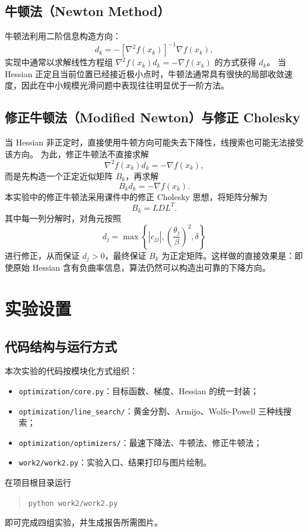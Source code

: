 \documentclass[12pt,a4paper]{ctexart}
\begin{document}
\subsection{牛顿法（Newton Method）}
牛顿法利用二阶信息构造方向：
\begin{equation}
d_k = -[\nabla^2 f(x_k)]^{-1}\nabla f(x_k),
\end{equation}
实现中通常以求解线性方程组 $\nabla^2 f(x_k) d_k = -\nabla f(x_k)$ 的方式获得 $d_k$。
当 Hessian 正定且当前位置已经接近极小点时，牛顿法通常具有很快的局部收敛速度，因此在中小规模光滑问题中表现往往明显优于一阶方法。

\subsection{修正牛顿法（Modified Newton）与修正 Cholesky}
当 Hessian 非正定时，直接使用牛顿方向可能失去下降性，线搜索也可能无法接受该方向。
为此，修正牛顿法不直接求解
\[
\nabla^2 f(x_k) d_k = -\nabla f(x_k),
\]
而是先构造一个正定近似矩阵 $B_k$，再求解
\begin{equation}
B_k d_k = -\nabla f(x_k).
\end{equation}
本实验中的修正牛顿法采用课件中的修正 Cholesky 思想，将矩阵分解为
\[
B_k = L D L^T.
\]
其中每一列分解时，对角元按照
\[
d_j = \max\left\{|c_{jj}|,\left(\frac{\theta_j}{\beta}\right)^2,\delta\right\}
\]
进行修正，从而保证 $d_j>0$，最终保证 $B_k$ 为正定矩阵。这样做的直接效果是：即使原始 Hessian 含有负曲率信息，算法仍然可以构造出可靠的下降方向。

\section{实验设置}
\subsection{代码结构与运行方式}
本次实验的代码按模块化方式组织：
\begin{itemize}
  \item \texttt{optimization/core.py}：目标函数、梯度、Hessian 的统一封装；
  \item \texttt{optimization/line\_search/}：黄金分割、Armijo、Wolfe-Powell 三种线搜索；
  \item \texttt{optimization/optimizers/}：最速下降法、牛顿法、修正牛顿法；
  \item \texttt{work2/work2.py}：实验入口、结果打印与图片绘制。
\end{itemize}
在项目根目录运行
\begin{quote}
\texttt{python work2/work2.py}
\end{quote}
即可完成四组实验，并生成报告所需图片。
\end{document}
